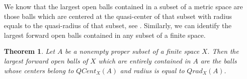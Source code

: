 \documentclass[12pt]{amsart}
\newtheorem{lemma}[definition]{Lemma}
\newtheorem{theorem}[definition]{Theorem}
\begin{document}



We know that the largest open balls contained in a subset of a metric space are those balls which are centered at the quasi-center of that subset with  radius equals to the quasi-radius of that subset, see \cite{Badra}. Similarly, we can identify the largest forward open balls contained in any subset of a finite space.

\begin{theorem}
Let $A$ be a nonempty proper subset of a finite space $X$. Then the largest forward open balls of $X$ which are entirely contained in $A$ are the balls whose centers belong to $QCent_{X}(A)$ and radius is equal to $Qrad_{X}(A)$.
\end{theorem}
\end{document}
